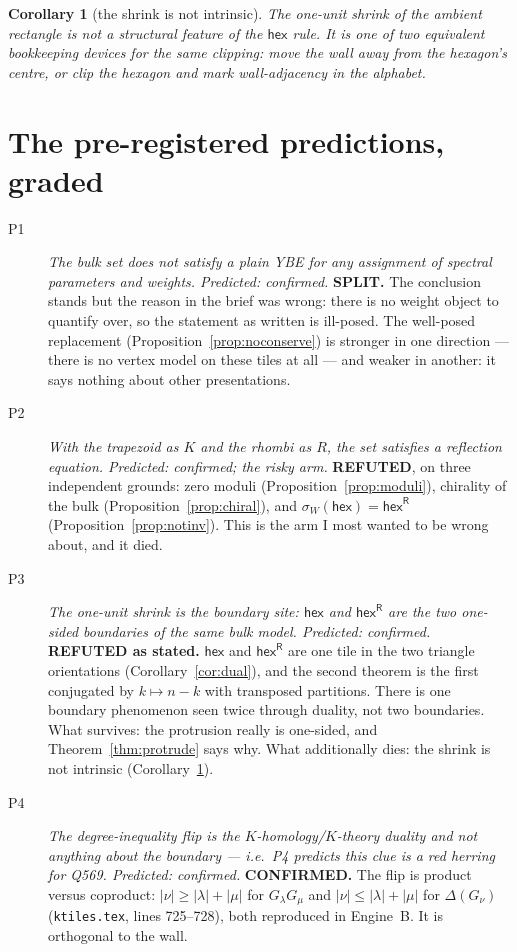 \documentclass[11pt]{article}
\newtheorem{corollary}[theorem]{Corollary}
\theoremstyle{definition}
\newcommand{\hex}{\mathsf{hex}}
\newcommand{\hexR}{\mathsf{hex}^{\mathsf{R}}}
\newcommand{\la}{\lambda}
\begin{document}
\begin{corollary}[the shrink is not intrinsic]\label{cor:notintrinsic}
The one-unit shrink of the ambient rectangle is not a structural feature of the
$\hex$ rule. It is one of two equivalent bookkeeping devices for the same
clipping: move the wall away from the hexagon's centre, or clip the hexagon and
mark wall-adjacency in the alphabet.
\end{corollary}

\section{The pre-registered predictions, graded}

\begin{description}
\item[P1] \emph{The bulk set does not satisfy a plain YBE for any assignment of
spectral parameters and weights. Predicted: confirmed.} \textbf{SPLIT.} The
conclusion stands but the reason in the brief was wrong: there is no weight
object to quantify over, so the statement as written is ill-posed. The
well-posed replacement (Proposition~\ref{prop:noconserve}) is stronger in one
direction --- there is no vertex model on these tiles at all --- and weaker in
another: it says nothing about other presentations.

\item[P2] \emph{With the trapezoid as $K$ and the rhombi as $R$, the set
satisfies a reflection equation. Predicted: confirmed; the risky arm.}
\textbf{REFUTED}, on three independent grounds: zero moduli
(Proposition~\ref{prop:moduli}), chirality of the bulk
(Proposition~\ref{prop:chiral}), and $\sigma_W(\hex)=\hexR$
(Proposition~\ref{prop:notinv}). This is the arm I most wanted to be wrong
about, and it died.

\item[P3] \emph{The one-unit shrink is the boundary site: $\hex$ and $\hexR$ are
the two one-sided boundaries of the same bulk model. Predicted: confirmed.}
\textbf{REFUTED as stated.} $\hex$ and $\hexR$ are one tile in the two triangle
orientations (Corollary~\ref{cor:dual}), and the second theorem is the first
conjugated by $k\mapsto n-k$ with transposed partitions. There is one boundary
phenomenon seen twice through duality, not two boundaries. What survives: the
protrusion really is one-sided, and Theorem~\ref{thm:protrude} says why. What
additionally dies: the shrink is not intrinsic
(Corollary~\ref{cor:notintrinsic}).

\item[P4] \emph{The degree-inequality flip is the $K$-homology/$K$-theory
duality and not anything about the boundary --- i.e.\ P4 predicts this clue is a
red herring for Q569. Predicted: confirmed.} \textbf{CONFIRMED.} The flip is
product versus coproduct: $|\nu|\ge|\la|+|\mu|$ for $G_\la G_\mu$ and
$|\nu|\le|\la|+|\mu|$ for $\Delta(G_\nu)$ (\texttt{ktiles.tex}, lines 725--728),
both reproduced in Engine~B. It is orthogonal to the wall.
\end{description}
\end{document}
